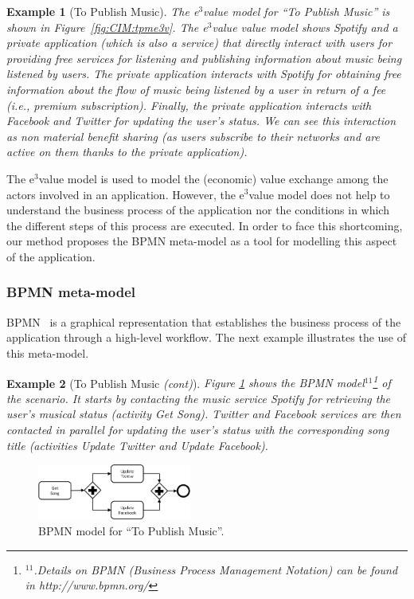 \documentclass[12pt,twoside]{article}
\theoremstyle{plain}
\theoremstyle{plain}
\newtheorem{example}{Example}
\begin{document}
\begin{multicols}{2}
\begin{example}[To Publish Music]
The e$^3$value model for ``To Publish Music'' is shown in Figure~\ref{fig:CIM:tpme3v}.
The e$^3$value value model shows Spotify and a private application (which is also a service) that directly interact with users for providing free services for listening and publishing information about music being listened by users. The private application interacts with Spotify for obtaining free information about the flow of music being listened by a user in return of a fee (i.e., premium subscription). Finally, the private application interacts with Facebook and Twitter for updating the user's status.
We can see this interaction as non material benefit sharing (as users subscribe to their networks and are active on them thanks to the private application).
\end{example}

The e$^3$value  model is used to model the (economic) value exchange among the actors involved in an application.
However, the e$^3$val\-ue model does not help to understand the business process of the application nor the conditions in which the different steps of this process are executed.
In order to face this shortcoming, our method proposes the BPMN meta-model as a tool for modelling this aspect of the application.



\subsubsection{BPMN meta-model}

BPMN~\cite{BPMN}  is a graphical representation that establishes the business process of the application through a high-level workflow.
The next example illustrates the use of this meta-model.

\begin{example}[To Publish Music \textit{(cont)}]\label{ex:toPublicMusicBPMN}
Figure \ref{fig:CIM:tpmbpmn} shows the BPMN model$^{11}$\footnote{$^{11}$.Details on BPMN (Business Process Management Notation) can be found in http://www.bpmn.org/} of the scenario.
It starts by contacting the music service Spotify for retrieving the user's  musical status (activity {\sf Get Song}).
Twitter and Facebook services are then contacted in parallel for updating the user's status with the corresponding song title (activities {\sf Update Twitter} and {\sf Update Facebook}).
\end{example}
%
\begin{figure}
\center
\includegraphics[width=0.45\textwidth]{SC.pdf}
\caption{\label{fig:CIM:tpmbpmn} BPMN model for ``To Publish Music''.}
\end{figure}


\end{multicols}
\end{document}
